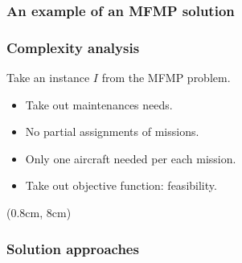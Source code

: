 \begin{frame}[t]
\frametitle{\textbf{An example of an MFMP solution}}
  
\end{frame}


\begin{frame}
\frametitle{\textbf{Complexity analysis}}
  
  Take an instance $I$ from the MFMP problem.
  \pause
  \begin{itemize}[<+->]
    \item Take out maintenances needs.
    \item No partial assignments of missions.
    \item Only one aircraft needed per each mission.
    \item Take out objective function: feasibility.
  \end{itemize}
  
  \begin{block}{}
  \end{block}
  \begin{textblock*}{1.1\textwidth}(0.8cm, 8cm)
    \begin{flushleft}
    \end{flushleft}
  \end{textblock*}
\end{frame}

\begin{frame}[noframenumbering]
\frametitle{\textbf{Solution approaches}}
  \begin{block}{\textbf{\firsttitleF}}
  \end{block}  

\end{frame}


